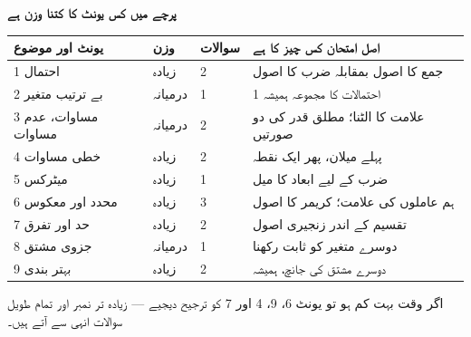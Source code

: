 \medskip
\noindent
\textbf{\color{bmblue}پرچے میں کس یونٹ کا کتنا وزن ہے}

\medskip
\begin{center}
\begin{tabular}{@{}p{4.4cm} p{1.8cm} p{1.6cm} p{6.6cm}@{}}
\toprule
\textbf{یونٹ اور موضوع} & \textbf{وزن} & \textbf{سوالات} & \textbf{اصل امتحان کس چیز کا ہے} \\
\midrule
\textenglish{1} احتمال            & زیادہ   & \textenglish{2} & جمع کا اصول بمقابلہ ضرب کا اصول \\
\textenglish{2} بے ترتیب متغیر    & درمیانہ & \textenglish{1} & احتمالات کا مجموعہ ہمیشہ \textenglish{1} \\
\textenglish{3} مساوات، عدم مساوات & درمیانہ & \textenglish{2} & علامت کا الٹنا؛ مطلق قدر کی دو صورتیں \\
\textenglish{4} خطی مساوات        & زیادہ   & \textenglish{2} & پہلے میلان، پھر ایک نقطہ \\
\textenglish{5} میٹرکس            & زیادہ   & \textenglish{1} & ضرب کے لیے ابعاد کا میل \\
\textenglish{6} محدد اور معکوس    & زیادہ   & \textenglish{3} & ہم عاملوں کی علامت؛ کریمر کا اصول \\
\textenglish{7} حد اور تفرق       & زیادہ   & \textenglish{2} & تقسیم کے اندر زنجیری اصول \\
\textenglish{8} جزوی مشتق         & درمیانہ & \textenglish{1} & دوسرے متغیر کو ثابت رکھنا \\
\textenglish{9} بہتر بندی         & زیادہ   & \textenglish{2} & دوسرے مشتق کی جانچ، ہمیشہ \\
\bottomrule
\end{tabular}
\end{center}

\medskip
\noindent
اگر وقت بہت کم ہو تو یونٹ \textenglish{6}، \textenglish{9}، \textenglish{4} اور
\textenglish{7} کو ترجیح دیجیے --- زیادہ تر نمبر اور تمام طویل سوالات انہی سے
آتے ہیں۔
